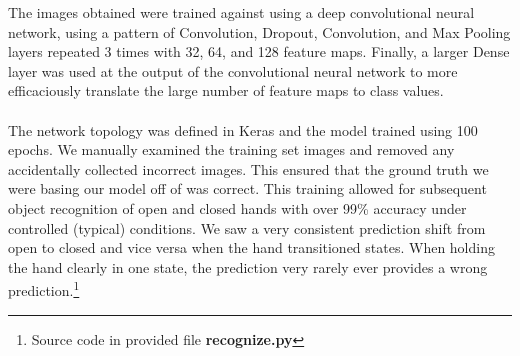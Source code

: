 \documentclass[twoside,twocolumn]{article}
\begin{document}
The images obtained were trained against using a deep convolutional neural network, using a pattern of Convolution, Dropout, Convolution, and Max Pooling layers repeated 3 times with 32, 64, and 128 feature maps. Finally, a larger Dense layer was used at the output of the convolutional neural network to more efficaciously translate the large number of feature maps to class values. \\ \\
The network topology was defined in Keras and the model trained using 100 epochs. We manually examined the training set images and removed any accidentally collected incorrect images. This ensured that the ground truth we were basing our model off of was correct. This training allowed for subsequent object recognition of open and closed hands with over 99\% accuracy under controlled (typical) conditions. We saw a very consistent prediction shift from open to closed and vice versa when the hand transitioned states. When holding the hand clearly in one state, the prediction very rarely ever provides a wrong prediction.\footnote{Source code in provided file \textbf{recognize.py}}
\end{document}
